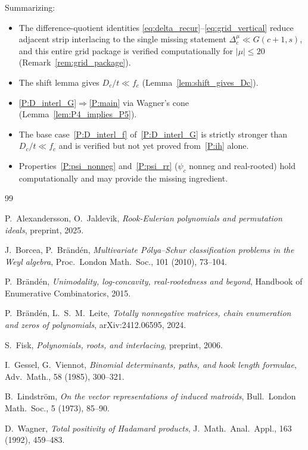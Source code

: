 \documentclass[11pt,reqno]{amsart}
\theoremstyle{definition}
\newcommand{\interl}{\ll}
\begin{document}
Summarizing:
\begin{itemize}
\item The difference-quotient identities
  \eqref{eq:delta_recur}--\eqref{eq:grid_vertical}
  reduce adjacent strip interlacing to the single missing statement
  $\Delta_c^\mu \interl G(c{+}1,s)$, and this entire grid package
  is verified computationally for $|\mu| \leq 20$
  (Remark~\ref{rem:grid_package}).
\item The shift lemma gives
  $D_c/t \interl f_c$ (Lemma~\ref{lem:shift_gives_Dc}).
\item \ref{P:D_interl_G}${}\Rightarrow{}$\ref{P:main}
  via Wagner's cone (Lemma~\ref{lem:P4_implies_P5}).
\item The base case~\ref{P:D_interl_f} of~\ref{P:D_interl_G}
  is strictly stronger than $D_c/t \interl f_c$
  and is verified but not yet proved from~\ref{P:ih} alone.
\item Properties~\ref{P:psi_nonneg} and~\ref{P:psi_rr}
  ($\psi_c$ nonneg and real-rooted) hold computationally
  and may provide the missing ingredient.
\end{itemize}


\begin{thebibliography}{99}

P.~Alexandersson, O.~Jaldevik,
\emph{Rook-Eulerian polynomials and permutation ideals},
preprint, 2025.

J.~Borcea, P.~Br\"and\'en,
\emph{Multivariate P\'olya--Schur classification problems
in the Weyl algebra},
Proc.\ London Math.\ Soc., 101 (2010), 73--104.

P.~Br\"and\'en,
\emph{Unimodality, log-concavity, real-rootedness and beyond},
Handbook of Enumerative Combinatorics, 2015.

P.~Br\"and\'en, L.~S.~M.~Leite,
\emph{Totally nonnegative matrices, chain enumeration and zeros of polynomials},
arXiv:2412.06595, 2024.

S.~Fisk,
\emph{Polynomials, roots, and interlacing},
preprint, 2006.

I.~Gessel, G.~Viennot,
\emph{Binomial determinants, paths, and hook length formulae},
Adv.\ Math., 58 (1985), 300--321.

B.~Lindstr\"om,
\emph{On the vector representations of induced matroids},
Bull.\ London Math.\ Soc., 5 (1973), 85--90.

D.~Wagner,
\emph{Total positivity of Hadamard products},
J.~Math.~Anal.~Appl., 163 (1992), 459--483.
\end{thebibliography}
\end{document}
